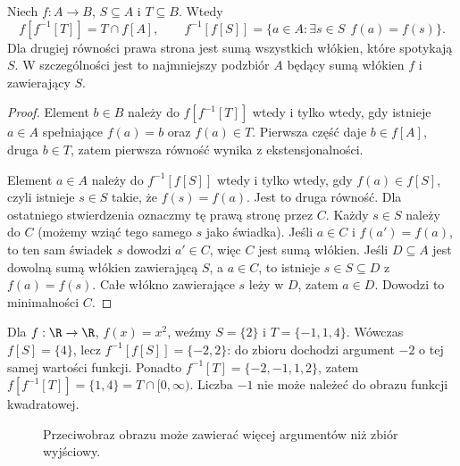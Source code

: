 \begin{twierdzenie}
\label{thm:image-preimage-exact-xliv}
Niech $f:A\to B$, $S\subseteq A$ i $T\subseteq B$. Wtedy
\[
 f[f^{-1}[T]]=T\cap f[A],\qquad
 f^{-1}[f[S]]=
 \{a\in A:\exists s\in S\ \ f(a)=f(s)\}.
\]
Dla drugiej równości prawa strona jest sumą wszystkich włókien,
które spotykają $S$. W szczególności jest to najmniejszy
podzbiór $A$ będący sumą włókien $f$ i zawierający $S$.
\end{twierdzenie}
\begin{proof}
Element $b\in B$ należy do $f[f^{-1}[T]]$ wtedy i tylko
wtedy, gdy istnieje $a\in A$ spełniające $f(a)=b$ oraz
$f(a)\in T$. Pierwsza część daje $b\in f[A]$, druga
$b\in T$, zatem pierwsza równość wynika z ekstensjonalności.

Element $a\in A$ należy do $f^{-1}[f[S]]$ wtedy i tylko
wtedy, gdy $f(a)\in f[S]$, czyli istnieje $s\in S$ takie,
że $f(s)=f(a)$. Jest to druga równość.
Dla ostatniego stwierdzenia oznaczmy tę prawą stronę przez $C$.
Każdy $s\in S$ należy do $C$ (możemy wziąć tego samego $s$
jako świadka). Jeśli $a\in C$ i $f(a')=f(a)$, to ten sam
świadek $s$ dowodzi $a'\in C$, więc $C$ jest sumą włókien.
Jeśli $D\subseteq A$ jest dowolną sumą włókien zawierającą $S$,
a $a\in C$, to istnieje $s\in S\subseteq D$ z $f(a)=f(s)$.
Całe włókno zawierające $s$ leży w $D$, zatem $a\in D$.
Dowodzi to minimalności $C$.
\end{proof}
\begin{przyklad}
Dla $f:\R\to\R$, $f(x)=x^2$, weźmy $S=\{2\}$
i $T=\{-1,1,4\}$. Wówczas $f[S]=\{4\}$, lecz
$f^{-1}[f[S]]=\{-2,2\}$: do zbioru dochodzi argument $-2$
o tej samej wartości funkcji. Ponadto $f^{-1}[T]=\{-2,-1,1,2\}$,
zatem $f[f^{-1}[T]]=\{1,4\}=T\cap[0,\infty)$.
Liczba $-1$ nie może należeć do obrazu funkcji kwadratowej.
\end{przyklad}


\begin{figure}[htbp]
\centering
{}
\caption{Przeciwobraz obrazu może zawierać więcej argumentów niż zbiór wyjściowy.}
\label{fig:preimage-image-xliv}
\end{figure}


